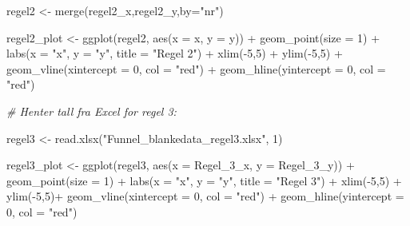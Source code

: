 \documentclass[
]{book}
\newenvironment{Shaded}{\begin{snugshade}}{\end{snugshade}}
\newcommand{\AttributeTok}[1]{\textcolor[rgb]{0.77,0.63,0.00}{#1}}
\newcommand{\CommentTok}[1]{\textcolor[rgb]{0.56,0.35,0.01}{\textit{#1}}}
\newcommand{\DecValTok}[1]{\textcolor[rgb]{0.00,0.00,0.81}{#1}}
\newcommand{\FunctionTok}[1]{\textcolor[rgb]{0.00,0.00,0.00}{#1}}
\newcommand{\NormalTok}[1]{#1}
\newcommand{\OtherTok}[1]{\textcolor[rgb]{0.56,0.35,0.01}{#1}}
\newcommand{\SpecialCharTok}[1]{\textcolor[rgb]{0.00,0.00,0.00}{#1}}
\newcommand{\StringTok}[1]{\textcolor[rgb]{0.31,0.60,0.02}{#1}}
\begin{document}
\begin{Shaded}
\begin{Highlighting}[]
\NormalTok{regel2 }\OtherTok{\textless{}{-}} \FunctionTok{merge}\NormalTok{(regel2\_x,regel2\_y,}\AttributeTok{by=}\StringTok{"nr"}\NormalTok{)}

\NormalTok{regel2\_plot }\OtherTok{\textless{}{-}} \FunctionTok{ggplot}\NormalTok{(regel2, }\FunctionTok{aes}\NormalTok{(}\AttributeTok{x =}\NormalTok{ x, }\AttributeTok{y =}\NormalTok{ y)) }\SpecialCharTok{+}
  \FunctionTok{geom\_point}\NormalTok{(}\AttributeTok{size =} \DecValTok{1}\NormalTok{) }\SpecialCharTok{+} \FunctionTok{labs}\NormalTok{(}\AttributeTok{x =} \StringTok{"x"}\NormalTok{, }\AttributeTok{y =} \StringTok{"y"}\NormalTok{, }\AttributeTok{title =} \StringTok{"Regel 2"}\NormalTok{) }\SpecialCharTok{+} \FunctionTok{xlim}\NormalTok{(}\SpecialCharTok{{-}}\DecValTok{5}\NormalTok{,}\DecValTok{5}\NormalTok{) }\SpecialCharTok{+} \FunctionTok{ylim}\NormalTok{(}\SpecialCharTok{{-}}\DecValTok{5}\NormalTok{,}\DecValTok{5}\NormalTok{) }\SpecialCharTok{+} \FunctionTok{geom\_vline}\NormalTok{(}\AttributeTok{xintercept =} \DecValTok{0}\NormalTok{, }\AttributeTok{col =} \StringTok{"red"}\NormalTok{) }\SpecialCharTok{+} \FunctionTok{geom\_hline}\NormalTok{(}\AttributeTok{yintercept =} \DecValTok{0}\NormalTok{, }\AttributeTok{col =} \StringTok{"red"}\NormalTok{)}

\CommentTok{\# Henter tall fra Excel for regel 3:}

\NormalTok{regel3 }\OtherTok{\textless{}{-}} \FunctionTok{read.xlsx}\NormalTok{(}\StringTok{"Funnel\_blankedata\_regel3.xlsx"}\NormalTok{, }\DecValTok{1}\NormalTok{)}

\NormalTok{regel3\_plot }\OtherTok{\textless{}{-}} \FunctionTok{ggplot}\NormalTok{(regel3, }\FunctionTok{aes}\NormalTok{(}\AttributeTok{x =}\NormalTok{ Regel\_3\_x, }\AttributeTok{y =}\NormalTok{ Regel\_3\_y)) }\SpecialCharTok{+}
  \FunctionTok{geom\_point}\NormalTok{(}\AttributeTok{size =} \DecValTok{1}\NormalTok{) }\SpecialCharTok{+} \FunctionTok{labs}\NormalTok{(}\AttributeTok{x =} \StringTok{"x"}\NormalTok{, }\AttributeTok{y =} \StringTok{"y"}\NormalTok{, }\AttributeTok{title =} \StringTok{"Regel 3"}\NormalTok{) }\SpecialCharTok{+} \FunctionTok{xlim}\NormalTok{(}\SpecialCharTok{{-}}\DecValTok{5}\NormalTok{,}\DecValTok{5}\NormalTok{) }\SpecialCharTok{+} \FunctionTok{ylim}\NormalTok{(}\SpecialCharTok{{-}}\DecValTok{5}\NormalTok{,}\DecValTok{5}\NormalTok{)}\SpecialCharTok{+} \FunctionTok{geom\_vline}\NormalTok{(}\AttributeTok{xintercept =} \DecValTok{0}\NormalTok{, }\AttributeTok{col =} \StringTok{"red"}\NormalTok{) }\SpecialCharTok{+} \FunctionTok{geom\_hline}\NormalTok{(}\AttributeTok{yintercept =} \DecValTok{0}\NormalTok{, }\AttributeTok{col =} \StringTok{"red"}\NormalTok{)}


\end{Highlighting}
\end{Shaded}
\end{document}
